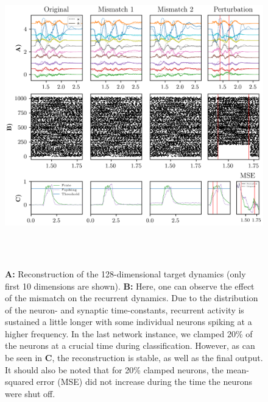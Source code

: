 \documentclass[twoside,11pt,titlepage]{article}
\begin{document}
\begin{figure}[!htb]
  \includegraphics[width = \columnwidth, height=13cm]{figures/figure4.png}
  \caption{\textbf{A:} Reconstruction of the 128-dimensional target dynamics (only first 10 dimensions are shown). \textbf{B:} Here,
  one can observe the effect of the mismatch on the recurrent dynamics. Due to the distribution of the neuron- and synaptic
  time-constants, recurrent activity is sustained a little longer with some individual neurons spiking at a higher frequency.
  In the last network instance, we clamped 20\% of the neurons at a crucial time during classification. However, as can be seen
  in \textbf{C}, the reconstruction is stable, as well as the final output. It should also be noted that
  for 20\% clamped neurons, the mean-squared error (MSE) did not increase during the time the neurons were shut off.}
  \label{fig:figure4}
\end{figure}
\end{document}
